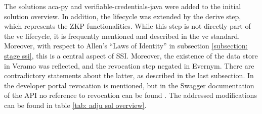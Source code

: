 	The solutions aca-py and verifiable-credentials-java were added to the initial solution overview. In addition, the lifecycle was extended by the derive step, which represents the \ac{ZKP} functionalities. While this step is not directly part of the \ac{vc} lifecycle, it is frequently mentioned and described in the \ac{vc} standard. Moreover, with respect to Allen's “Laws of Identity” in subsection \ref{subsection: stage ssi}, this is a central aspect of \ac{SSI}. Moreover, the existence of the data store in Veramo was reflected, and the revocation step negated in Evernym. There are contradictory statements about the latter, as described in the last subsection. In the developer portal \cite{evernym_developer_2021} revocation is mentioned, but in the Swagger documentation of the API no reference to revocation can be found \cite{evernym_verity-rest-api_2021}. The addressed modifications can be found in table \ref{tab: adju sol overview}.
	
